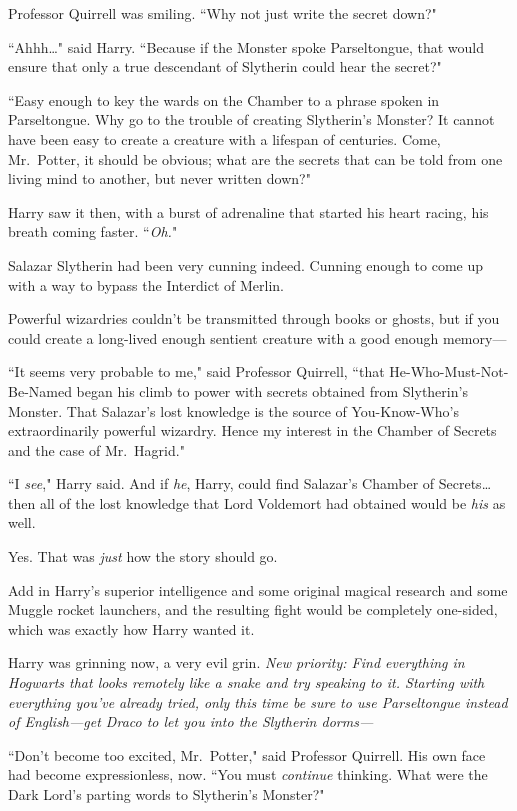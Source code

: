 Professor Quirrell was smiling. ``Why not just write the secret down?"

``Ahhh{\ldots}" said Harry. ``Because if the Monster spoke Parseltongue, that would ensure that only a true descendant of Slytherin could hear the secret?"

``Easy enough to key the wards on the Chamber to a phrase spoken in Parseltongue. Why go to the trouble of creating Slytherin's Monster? It cannot have been easy to create a creature with a lifespan of centuries. Come, Mr.~Potter, it should be obvious; what are the secrets that can be told from one living mind to another, but never written down?"

Harry saw it then, with a burst of adrenaline that started his heart racing, his breath coming faster. ``\emph{Oh.}"

Salazar Slytherin had been very cunning indeed. Cunning enough to come up with a way to bypass the Interdict of Merlin.

Powerful wizardries couldn't be transmitted through books or ghosts, but if you could create a long-lived enough sentient creature with a good enough memory—

``It seems very probable to me," said Professor Quirrell, ``that He-Who-Must-Not-Be-Named began his climb to power with secrets obtained from Slytherin's Monster. That Salazar's lost knowledge is the source of You-Know-Who's extraordinarily powerful wizardry. Hence my interest in the Chamber of Secrets and the case of Mr.~Hagrid."

``I \emph{see}," Harry said. And if \emph{he}, Harry, could find Salazar's Chamber of Secrets{\ldots} then all of the lost knowledge that Lord Voldemort had obtained would be \emph{his} as well.

Yes. That was \emph{just} how the story should go.

Add in Harry's superior intelligence and some original magical research and some Muggle rocket launchers, and the resulting fight would be completely one-sided, which was exactly how Harry wanted it.

Harry was grinning now, a very evil grin. \emph{New priority: Find everything in Hogwarts that looks remotely like a snake and try speaking to it. Starting with everything you've already tried, only this time be sure to use Parseltongue instead of English—get Draco to let you into the Slytherin dorms—}

``Don't become too excited, Mr.~Potter," said Professor Quirrell. His own face had become expressionless, now. ``You must \emph{continue} thinking. What were the Dark Lord's parting words to Slytherin's Monster?"

